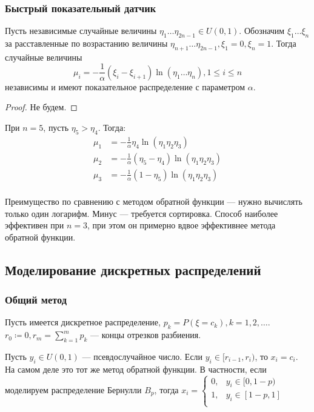 \subsubsection{Быстрый показательный датчик}

\begin{theorem}
    Пусть независимые случайные величины \(\eta_1 \dots \eta_{2n - 1} \in U(0, 1)\). Обозначим \(\xi_1 \dots \xi_n\) за расставленные по возрастанию величины \(\eta_{n + 1} \dots \eta_{2n - 1}, \xi_1 = 0, \xi_n = 1\). Тогда случайные величины
    \[\mu_i = - \frac{1}{\alpha}(\xi_i - \xi_{i + 1})\ln(\eta_1 \dots \eta_n), 1 \leq i \leq n\]
    независимы и имеют показательное распределение с параметром \(\alpha\).
\end{theorem}
\begin{proof}
    Не будем.
\end{proof}

\begin{example}
    При \(n = 5\), пусть \(\eta_5 > \eta_4\). Тогда:
    \begin{align*}
        \mu_1 & = - \frac{1}{\alpha}\eta_4 \ln (\eta_1\eta_2\eta_3)            \\
        \mu_2 & = - \frac{1}{\alpha}(\eta_5 - \eta_4) \ln (\eta_1\eta_2\eta_3) \\
        \mu_3 & = - \frac{1}{\alpha}(1 - \eta_5) \ln (\eta_1\eta_2\eta_3)      \\
    \end{align*}
\end{example}

Преимущество по сравнению с методом обратной функции --- нужно вычислять только один логарифм. Минус --- требуется сортировка. Способ наиболее эффективен при \(n = 3\), при этом он примерно вдвое эффективнее метода обратной функции.

\subsection{Моделирование дискретных распределений}

\subsubsection{Общий метод}

Пусть имеется дискретное распределение, \(p_k = P(\xi = c_k), k = 1, 2, \dots\). \(r_0 \coloneqq 0, r_m = \sum_{k=1}^{m} p_k\) --- концы отрезков разбиения.

Пусть \(y_i \in U(0, 1)\) --- псевдослучайное число. Если \(y_i \in [r_{i-1}, r_i)\), то \(x_i = c_i\). На самом деле это тот же метод обратной функции. В частности, если моделируем распределение Бернулли \(B_p\), тогда \(x_i = \begin{cases}
    0, & y_i \in [0, 1 - p) \\
    1, & y_i \in [1 - p, 1] \\
\end{cases}\)

